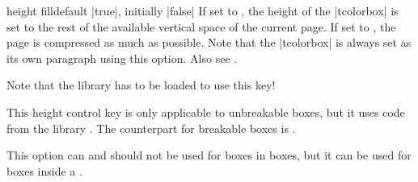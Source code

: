 \clearpage
\begin{docTcbKey}[][doc new and updated={2014-09-22}{2016-02-17}]{height fill}{}{default |true|, initially |false|}
If set to , the height of the |tcolorbox| is set to the rest of the
available vertical space of the current page.
If set to , the page is compressed as much as possible.
Note that the |tcolorbox|
is always set as its own paragraph using this option.
Also see .
\begin{marker}
Note that the library  has to be loaded to use this key!
\end{marker}
This height control key is only applicable to unbreakable boxes, but it
uses code from the library .
The counterpart for breakable boxes is .

This option can and should not be used for boxes in boxes, but it can be
used for boxes inside a .

\begin{dispListing}
\begin{tcolorbox}[height fill,
  colback=red!5!white,colframe=red!75!black,fonttitle=\bfseries,
  title=Box which fills the rest of the page]
\lipsum[1]
\end{tcolorbox}
\end{dispListing}
\end{docTcbKey}
{\tcbusetemp}


